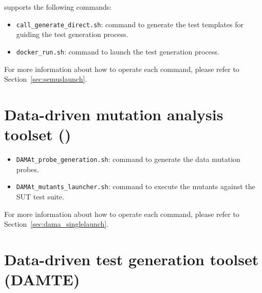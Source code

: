 {\SEMUS supports the following commands:
	\begin{itemize}
	\item \texttt{call\_generate\_direct.sh}: command to generate the test templates for guiding the test generation process.
	\item \texttt{docker\_run.sh}: command to launch the test generation process.
\end{itemize}

For more information about how to operate each command, please refer to Section~\ref{sec:semuslaunch}.

\section{Data-driven mutation analysis toolset (\DAMA)}
\begin{itemize}
\item \texttt{DAMAt\_probe\_generation.sh}: command to generate the data mutation probes.
\item \texttt{DAMAt\_mutants\_launcher.sh}: command to execute the mutants against the SUT test suite.
\end{itemize}

For more information about how to operate each command, please refer to Section~\ref{sec:dama_singlelaunch}.

\section{Data-driven test generation toolset (DAMTE)}
}
